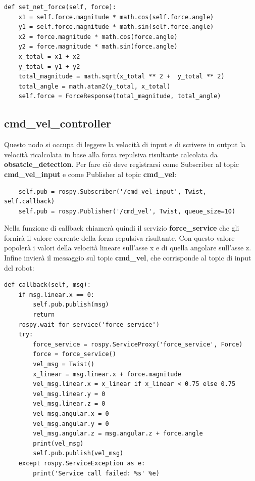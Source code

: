 \documentclass[Lau, binding=0.6cm, oneside]{sapthesis}
\begin{document}
\begin{lstlisting}
def set_net_force(self, force):
    x1 = self.force.magnitude * math.cos(self.force.angle)
    y1 = self.force.magnitude * math.sin(self.force.angle)
    x2 = force.magnitude * math.cos(force.angle)
    y2 = force.magnitude * math.sin(force.angle)
    x_total = x1 + x2
    y_total = y1 + y2
    total_magnitude = math.sqrt(x_total ** 2 +  y_total ** 2)
    total_angle = math.atan2(y_total, x_total)
    self.force = ForceResponse(total_magnitude, total_angle)
\end{lstlisting}

\subsection{cmd\_vel\_controller}
Questo nodo si occupa di leggere la velocità di input e di scrivere in output la velocità ricalcolata in base alla forza repulsiva risultante calcolata da \textbf{obsatcle\_detection}.
Per fare ciò deve registrarsi come Subscriber al topic \textbf{cmd\_vel\_input} e come Publisher al topic \textbf{cmd\_vel}:

\begin{lstlisting}
    self.pub = rospy.Subscriber('/cmd_vel_input', Twist, self.callback)
    self.pub = rospy.Publisher('/cmd_vel', Twist, queue_size=10)
\end{lstlisting}

Nella funzione di callback chiamerà quindi il servizio \textbf{force\_service} che gli fornirà il valore corrente della forza repulsiva risultante.
Con questo valore popolerà i valori della velocità lineare sull'asse x e di quella angolare sull'asse z.
Infine invierà il messaggio sul topic \textbf{cmd\_vel}, che corrisponde al topic di input del robot:

\begin{lstlisting}
def callback(self, msg):
    if msg.linear.x == 0:
        self.pub.publish(msg)
        return
    rospy.wait_for_service('force_service')
    try:
        force_service = rospy.ServiceProxy('force_service', Force)
        force = force_service()
        vel_msg = Twist()
        x_linear = msg.linear.x + force.magnitude
        vel_msg.linear.x = x_linear if x_linear < 0.75 else 0.75
        vel_msg.linear.y = 0
        vel_msg.linear.z = 0
        vel_msg.angular.x = 0
        vel_msg.angular.y = 0
        vel_msg.angular.z = msg.angular.z + force.angle
        print(vel_msg)
        self.pub.publish(vel_msg)
    except rospy.ServiceException as e:
        print('Service call failed: %s' %e)
\end{lstlisting}



\end{document}
